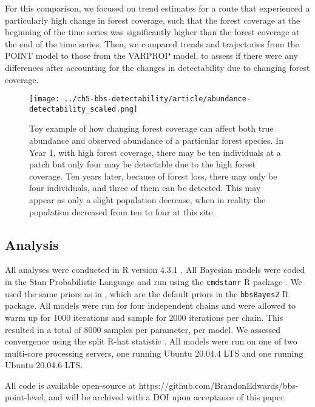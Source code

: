 \par For this comparison, we focused on trend estimates for a route that experienced a particularly high change in forest coverage, such that the forest coverage at the beginning of the time series was significantly higher than the forest coverage at the end of the time series.
Then, we compared trends and trajectories from the POINT model to those from the VARPROP model, to assess if there were any differences after accounting for the changes in detectability due to changing forest coverage.

\begin{figure}[h]
	\texttt{[image: ../ch5-bbs-detectability/article/abundance-detectability\_scaled.png]}
	\caption{Toy example of how changing forest coverage can affect both true abundance and observed abundance of a particular forest species. In Year 1, with high forest coverage, there may be ten individuals at a patch but only four may be detectable due to the high forest coverage. Ten years later, because of forest loss, there may only be four individuals, and three of them can be detected. This may appear as only a slight population decrease, when in reality the population decreased from ten to four at this site.}
	\label{fig:example}
\end{figure}

\subsection{Analysis}
\par All analyses were conducted in R version 4.3.1 \citep{r_core_team_r_2024}.
All Bayesian models were coded in the Stan Probabilistic Language \citep{stan_development_team_stan_2024} and run using the \texttt{cmdstanr} R package \citep{gabry_cmdstanr_2023}.
We used the same priors as in \citet{smith_spatially_2023}, which are the default priors in the \texttt{bbsBayes2} R package.
All models were run for four independent chains and were allowed to warm up for 1000 iterations and sample for 2000 iterations per chain.
This resulted in a total of 8000 samples per parameter, per model.
We assessed convergence using the split R-hat statistic \citep{vehtari_rank-normalization_2021}.
All models were run on one of two multi-core processing servers, one running Ubuntu 20.04.4 LTS and one running Ubuntu 20.04.6 LTS.

\par All code is available open-source at https://github.com/BrandonEdwards/bbs-point-level, and will be archived with a DOI upon acceptance of this paper.

